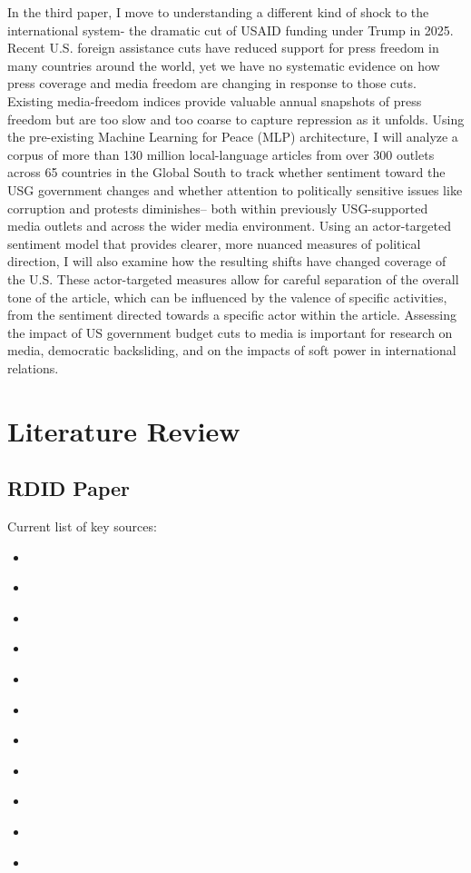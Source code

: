 \documentclass[12pt]{article}
\begin{document}
In the third paper, I move to understanding a different kind of shock to the international system- the dramatic cut of USAID funding under Trump in 2025. Recent U.S. foreign assistance cuts have reduced support for press freedom in many countries around the world, yet we have no systematic evidence on how press coverage and media freedom are changing in response to those cuts. Existing media-freedom indices provide valuable annual snapshots of press freedom but are too slow and too coarse to capture repression as it unfolds. Using the pre-existing Machine Learning for Peace (MLP) architecture, I will analyze a corpus of more than 130 million local-language articles from over 300 outlets across 65 countries in the Global South to track whether sentiment toward the USG government changes and whether attention to politically sensitive issues like corruption and protests diminishes-- both within previously USG-supported media outlets and across the wider media environment. Using an actor-targeted sentiment model that provides clearer, more nuanced measures of political direction, I will also examine how the resulting shifts have changed coverage of the U.S. These actor-targeted measures allow for careful separation of the overall tone of the article, which can be influenced by the valence of specific activities, from the sentiment directed towards a specific actor within the article. Assessing the impact of US government budget cuts to media is important for research on media, democratic backsliding, and on the impacts of soft power in international relations. 


\section*{Literature Review}

\subsection*{RDID Paper}

Current list of key sources:
\begin{itemize}
    \item \citet{wooldridge_two-way_2021}
    \item \citet{callaway_difference--differences_2024}
    \item \citet{grembi_fiscal_2016}
    \item \citet{galindo-silva_fuzzy_2018}
    \item \citet{tramontin_shinoki_difference--discontinuities_2024}
    \item \citet{zubizarreta_covariate_2023}
    \item \citet{cattaneo_extrapolating_2021}
    \item \citet{cattaneo_regression_2022}
    \item \citet{cattaneo_practical_2019}
    \item \citet{cattaneo_practical_2024}
    \item \citet{bansak_effect_2022}
\end{itemize}
\end{document}
